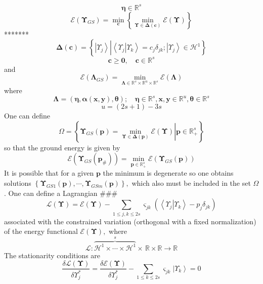 \documentclass[aps,preprint]{revtex4}%
\begin{document}
\[
\mathbf{\eta\in}\mathbb{R}^{s}%
\]%
\[
\mathcal{E}\left(  \mathbf{\Upsilon}_{GS}\right)  =\min_{\mathbf{c}}\left\{
\min_{\mathbf{\Upsilon\in\Delta}\left(  \mathbf{c}\right)  }\mathcal{E}\left(
\mathbf{\Upsilon}\right)  \right\}
\]
*******%
\[
\mathbf{\Delta}\left(  \mathbf{c}\right)  =\left\{  \left\vert \Upsilon
_{j}\right\rangle \left\vert \overset{}{\left\langle \left.  \Upsilon
_{j}\right\vert \Upsilon_{k}\right\rangle =c_{j}\delta_{jk};\left\vert
\Upsilon_{j}\right\rangle \in\mathcal{H}^{1}}\right.  \right\}
\]%
\[
\mathbf{c\geq0,\quad c\in}\mathbb{R}^{s}%
\]
and
\[
\mathcal{E}\left(  \mathbf{\Lambda}_{GS}\right)  =\min_{\mathbf{\Lambda\in
}\mathbb{R}^{s}\times\mathbb{R}^{u}\times\mathbb{R}^{s}}\mathcal{E}\left(
\mathbf{\Lambda}\right)
\]
where
\[
\mathbf{\Lambda}=\left(  \mathbf{\eta,\alpha}\left(  \mathbf{x,y}\right)
,\mathbf{\theta}\right)  ;\quad\mathbf{\eta\in}\mathbb{R}^{s},\mathbf{x,y\in
}\mathbb{R}^{u},\mathbf{\theta\in}\mathbb{R}^{s}%
\]%
\begin{equation}
u=\left(  2s+1\right)  -3s
\end{equation}
One can define
\[
\Omega=\left\{  \left.  \mathbf{\Upsilon}_{GS}\left(  \mathbf{p}\right)
=\min_{\mathbf{\Upsilon\in\Delta}\left(  \mathbf{p}\right)  }\mathcal{E}%
\left(  \mathbf{\Upsilon}\right)  \right\vert \mathbf{p\in}\mathbb{R}_{+}%
^{s}\right\}
\]
so that the ground energy is given by
\[
\mathcal{E}\left(  \mathbf{\Upsilon}_{GS}\left(  \mathbf{p}_{\#}\right)
\right)  =\min_{\mathbf{p\in}\mathbb{R}_{+}^{s}}\mathcal{E}\left(
\mathbf{\Upsilon}_{GS}\left(  \mathbf{p}\right)  \right)
\]
It is possible that for a given $\mathbf{p}$ the minimum is degenerate so one
obtains solutions $\left\{  \mathbf{\Upsilon}_{GS1}\left(  \mathbf{p}\right)
,\cdots,\mathbf{\Upsilon}_{GSm}\left(  \mathbf{p}\right)  \right\}  ,$ which
also must be included in the set $\Omega$. One can define a Lagrangian \#\#\#
\[
\mathcal{L}\left(  \mathbf{\Upsilon}\right)  =\mathcal{E}\left(
\mathbf{\Upsilon}\right)  -\sum_{1\leq j,k\leq2s}\varsigma_{jk}\left(
\left\langle \left.  \Upsilon_{j}\right\vert \Upsilon_{k}\right\rangle
-p_{j}\delta_{jk}\right)
\]
associated with the constrained variation (orthogonal with a fixed
normalization) of the energy functional $\mathcal{E}\left(  \mathbf{\Upsilon
}\right)  ,$ where
\[
\mathcal{L}:\overset{s}{\overbrace{\mathcal{H}^{1}\times\cdots\times
\mathcal{H}^{1}}}\times\,\mathbb{R\times R}\rightarrow\mathbb{R}%
\]
The stationarity conditions are
\[
\frac{\delta\mathcal{L}\left(  \mathbf{\Upsilon}\right)  }{\delta\Upsilon
_{j}^{\ast}}=\frac{\delta\mathcal{E}\left(  \mathbf{\Upsilon}\right)  }%
{\delta\Upsilon_{j}^{\ast}}-\sum_{1\leq k\leq2s}\varsigma_{jk}\left\vert
\Upsilon_{k}\right\rangle =0
\]
\end{document}
